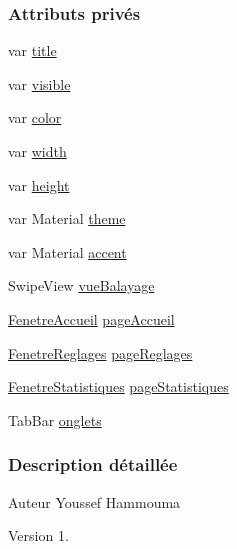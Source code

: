 \subsubsection*{Attributs privés}
\begin{DoxyCompactItemize}
\item 
var \hyperlink{class_fenetre_t_t_p_a_a1eab7a83d3a2229552545ecc18d8b9db}{title}
\item 
var \hyperlink{class_fenetre_t_t_p_a_aa4d266be193149ec0a5bdcc9898e742d}{visible}
\item 
var \hyperlink{class_fenetre_t_t_p_a_aafa1f92f2a38e5bac3e822c96b528304}{color}
\item 
var \hyperlink{class_fenetre_t_t_p_a_a6e3f108c98a7498a9ee09b6b9a557fcf}{width}
\item 
var \hyperlink{class_fenetre_t_t_p_a_a815865c868b94cb64b71a3a7a1ae2f6c}{height}
\item 
var Material \hyperlink{class_fenetre_t_t_p_a_a7f76a86269bbb93725620649d73b75e3}{theme}
\item 
var Material \hyperlink{class_fenetre_t_t_p_a_a3608ac8f593e01358ae75c5addfeeeea}{accent}
\item 
Swipe\+View \hyperlink{class_fenetre_t_t_p_a_a50e47f6ecb4c6c46d32d1e817e0fa147}{vue\+Balayage}
\item 
\hyperlink{class_fenetre_accueil}{Fenetre\+Accueil} \hyperlink{class_fenetre_t_t_p_a_aa81dd949c443f9e85049cb30a4793796}{page\+Accueil}
\item 
\hyperlink{class_fenetre_reglages}{Fenetre\+Reglages} \hyperlink{class_fenetre_t_t_p_a_a667472eb8d26854662d453e7b8626a43}{page\+Reglages}
\item 
\hyperlink{class_fenetre_statistiques}{Fenetre\+Statistiques} \hyperlink{class_fenetre_t_t_p_a_a7dacc005ccd99ee460641d2ed042c873}{page\+Statistiques}
\item 
Tab\+Bar \hyperlink{class_fenetre_t_t_p_a_ae327383bec72c47c9fa09cef26ca4b57}{onglets}
\end{DoxyCompactItemize}


\subsubsection{Description détaillée}
\begin{DoxyAuthor}{Auteur}
Youssef Hammouma
\end{DoxyAuthor}
\begin{DoxyVersion}{Version}
1. 
\end{DoxyVersion}


